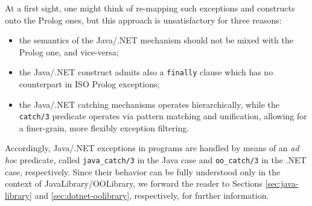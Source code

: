 At a first sight, one might think of re-mapping such exceptions and constructs onto the Prolog ones, but this approach is unsatisfactory for three reasons:
%
\begin{itemize}
  \item the semantics of the Java/.NET mechanism should not be mixed with the Prolog one, and vice-versa;

  \item the Java/.NET construct admits also a \texttt{finally} clause which has no counterpart in ISO Prolog exceptions;

  \item the Java/.NET catching mechanisms operates hierarchically, while the \texttt{catch/3} predicate operates via pattern matching and unification, allowing for a finer-grain, more flexibly exception filtering.
\end{itemize}

%
\noindent Accordingly, Java/.NET exceptions in \tuprolog{} programs are handled by means of an \textit{ad hoc} predicate, called \texttt{java\_catch/3} in the Java case and \texttt{oo\_catch/3} in the .NET case, respectively.
%
Since their behavior can be fully understood only in the context of JavaLibrary/OOLibrary, we forward the reader to Sections \ref{sec:java-library} and \ref{sec:dotnet-oolibrary}, respectively, for further information.

